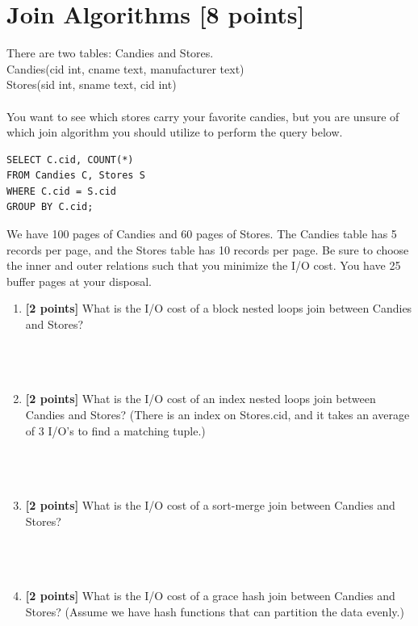 \documentclass[10pt]{article}
\begin{document}
\newpage
\section{Join Algorithms \textbf{[8 points]}}
There are two tables: Candies and Stores. \\

Candies(cid int, cname text, manufacturer text) \\

Stores(sid int, sname text, cid int) \\
\\
You want to see which stores carry your favorite candies, but you are unsure of which join
algorithm you should utilize to perform the query below.
\begin{verbatim}
SELECT C.cid, COUNT(*)
FROM Candies C, Stores S
WHERE C.cid = S.cid
GROUP BY C.cid;
\end{verbatim}

\noindent
We have 100 pages of Candies and 60 pages of Stores. The Candies table has 5 records per
page, and the Stores table has 10 records per page. Be sure to choose the inner and outer relations such that you minimize the I/O cost. You have 25 buffer pages at your disposal.


\begin{enumerate}
    \item \textbf{[2 points]}
          What is the I/O cost of a block nested loops join between Candies and Stores? \\ \\ \\ \\
    \item \textbf{[2 points]}
          What is the I/O cost of an index nested loops join between Candies and Stores?
          (There is an index on Stores.cid, and it takes an average of 3 I/O's to find a matching tuple.) \\ \\ \\ \\
    \item \textbf{[2 points]}
          What is the I/O cost of a sort-merge join between Candies and Stores? \\ \\ \\ \\
    \item \textbf{[2 points]}
          What is the I/O cost of a grace hash join between Candies and Stores?
          (Assume we have hash functions that can partition the data evenly.)
\end{enumerate}
\end{document}
